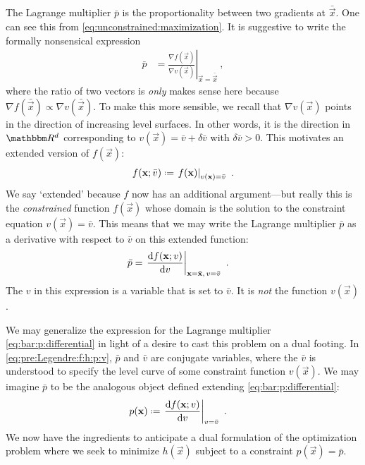 The Lagrange multiplier $\bar p$ is the proportionality between two gradients at $\bar{\vec{x}}$. One can see this from \eqref{eq:unconstrained:maximization}. It is suggestive to write the formally nonsensical expression
\begin{align}
    \bar p &= \left.\frac{\nabla f(\vec{x})}{\nabla v(\vec{x})}\right|_{\vec{x}=\bar{\vec{x}}} \ ,
\end{align}
where the ratio of two vectors is \emph{only} makes sense here because $\nabla f(\bar{\vec{x}}) \propto \nabla v(\bar{\vec{x}})$. To make this more sensible, we recall that $\nabla v(\vec{x})$ points in the direction of increasing level surfaces. In other words, it is the direction in $\RR^d$ corresponding to $v(\vec{x}) = \bar v + \delta \bar v$ with $\delta \bar v >0$. This motivates an extended version of $f(\vec{x})$:
\begin{align}
    f(\vec{x};\bar v) \defeq
    \left. f(\vec{x}) \right|_{v(\vec{x}) = \bar v} \ .
\end{align}
We say `extended' because $f$ now has an additional argument---but really this is the \emph{constrained} function $f(\vec{x})$ whose domain is the solution to the constraint equation $v(\vec{x}) = \bar v$. This means that we may write the Lagrange multiplier $\bar p$ as a derivative with respect to $\bar v$ on this extended function:
\begin{align}
    \bar p &= 
    \left.\frac{\operatorname{d}\mkern-3mu^{}\mkern-1mu{f}(\mathbf{x}; v)}{\operatorname{d}\mkern-3mu^{}\mkern-1mu{v}}\right|_{\mathbf{x}=\bar{\mathbf{x}}, \, v = \bar v} 
    \ .
    \label{eq:bar:p:differential}
\end{align}
The $v$ in this expression is a variable that is set to $\bar v$. It is \emph{not} the function $v(\vec{x})$. 

We may generalize the expression for the Lagrange multiplier \eqref{eq:bar:p:differential} in light of a desire to cast this problem on a dual footing. In \eqref{eq:pre:Legendre:f:h:p:v}, $\bar p$ and $\bar v$ are conjugate variables, where the $\bar v$ is understood to specify the level curve of some constraint function $v(\vec{x})$. We may imagine $\bar p$ to be the analogous object defined extending \eqref{eq:bar:p:differential}:
\begin{align}
    p(\vec{x}) &\defeq
    \left.\frac{\D f(\vec{x}; v)}{\D v}\right|_{v = \bar v} 
    \ .
    \label{eq:p:differential:function}
\end{align}
We now have the ingredients to anticipate a dual formulation of the optimization problem where we seek to minimize $h(\vec{x})$ subject to a constraint $p(\vec{x}) = \bar p$.


